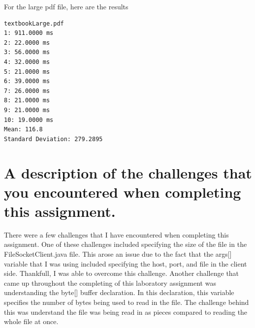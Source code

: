 \documentclass{article}
\begin{document}
For the large pdf file, here are the results
\begin{lstlisting}
textbookLarge.pdf
1: 911.0000 ms
2: 22.0000 ms
3: 56.0000 ms
4: 32.0000 ms
5: 21.0000 ms
6: 39.0000 ms
7: 26.0000 ms
8: 21.0000 ms
9: 21.0000 ms
10: 19.0000 ms
Mean: 116.8
Standard Deviation: 279.2895
\end{lstlisting}
\section{A description of the challenges that you encountered when completing this assignment.}

There were a few challenges that I have encountered when completing this assignment. One of these challenges included specifying the size of the file in the FileSocketClient.java file. This arose an issue due to the fact that the args[] variable that I was using included specifying the host, port, and file in the client side. Thankfull, I was able to overcome this challenge. Another challenge that came up throughout the completing of this laboratory assignment was understanding the byte[] buffer declaration. In this declaration, this variable specifies the number of bytes being used to read in the file. The challenge behind this was understand the file was being read in as pieces compared to reading the whole file at once.



\nocite{ibm_knowledge_center}
\nocite{www.tutorialspoint.com}





\end{document}
